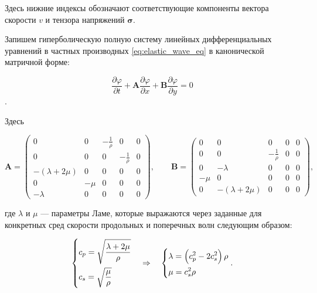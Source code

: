 \noindent Здесь нижние индексы обозначают соответствующие компоненты вектора скорости $v$ и тензора напряжений $\pmb{\sigma}$.

Запишем гиперболическую полную систему линейных дифференциальных уравнений в частных производных \eqref{eq:elastic_wave_eq} в канонической матричной форме:

\begin{equation}
    \dfrac{\partial \varphi}{\partial t} + 
    \pmb{A} \dfrac{\partial \varphi}{\partial x} + 
    \pmb{B} \dfrac{\partial \varphi}{\partial y} = 0
    \label{eq:gcm_system}
\end{equation}.

\noindent Здесь

\begin{equation*}
    \pmb{A} = \begin{pmatrix}
        0 & 0 & -\frac{1}{\rho} & 0 & 0 \\
        0 & 0 & 0 & -\frac{1}{\rho} & 0 \\
        -(\lambda+2\mu) & 0 & 0 & 0 & 0 \\
        0 & -\mu & 0 & 0 & 0 \\
        -\lambda & 0 & 0 & 0 & 0
    \end{pmatrix}, \qquad
    \pmb{B} = \begin{pmatrix}
        0 & 0 & 0 & 0 & 0 \\
        0 & 0 & -\frac{1}{\rho} & 0 & 0 \\
        0 & -\lambda & 0 & 0 & 0 \\
        -\mu & 0 & 0 & 0 & 0 \\
        0 & -(\lambda+2\mu) & 0 & 0 & 0
    \end{pmatrix},
\end{equation*}

\noindent где $\lambda$ и $\mu$ --- параметры Ламе, которые выражаются через заданные для конкретных сред скорости продольных и поперечных волн следующим образом:

\begin{equation*}
    \begin{dcases}
        c_p = \sqrt{\dfrac{\lambda + 2\mu}{\rho}} \\
        c_s = \sqrt{\dfrac{\mu}{\rho}}
    \end{dcases}
    \quad \Rightarrow \quad
    \begin{dcases}
        \lambda = \left(c_p^2 - 2 c_s^2\right) \rho \\
        \mu = c_s^2 \rho 
    \end{dcases}
    .
\end{equation*}

